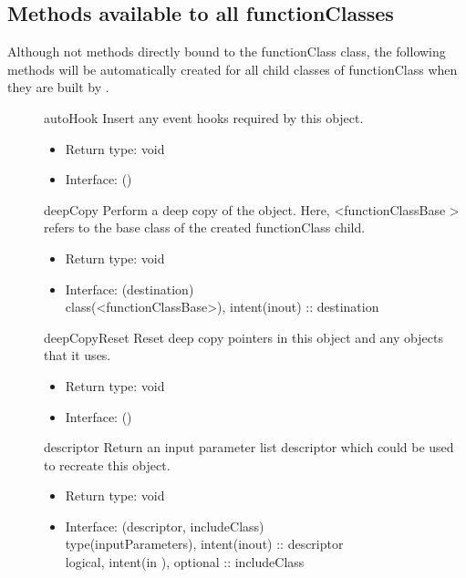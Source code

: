 \subsection{Methods available to all {\normalfont \ttfamily functionClass}es}\label{sec:functionClassAll}

Although not methods directly bound to the {\normalfont \ttfamily functionClass} class, the following methods will be automatically created for all child classes of {\normalfont \ttfamily functionClass} when they are built by \glc.


\begin{description}
  
\item[]{\normalfont \ttfamily autoHook} Insert any event hooks required by this object. 
\begin{itemize}
\item Return type: {\normalfont \ttfamily void}
\item Interface: {\normalfont \ttfamily ()}\\
\end{itemize}

\item[]{\normalfont \ttfamily deepCopy}  Perform a deep copy of the object. Here, {\normalfont \ttfamily \textless functionClassBase \textgreater} refers to the base class of the created {\normalfont \ttfamily functionClass} child.
\begin{itemize}
\item Return type: {\normalfont \ttfamily void}
\item Interface: {\normalfont \ttfamily (destination)}\\
  {\normalfont \ttfamily class(\textless functionClassBase\textgreater), intent(inout) :: destination}\\
\end{itemize}

\item[]{\normalfont \ttfamily deepCopyReset} Reset deep copy pointers in this object and any objects that it uses.
\begin{itemize}
\item Return type: {\normalfont \ttfamily void}
\item Interface: {\normalfont \ttfamily ()}\\
\end{itemize}

\item[]{\normalfont \ttfamily descriptor} Return an input parameter list descriptor which could be used to recreate this object.
\begin{itemize}
\item Return type: {\normalfont \ttfamily void}
\item Interface: {\normalfont \ttfamily (descriptor, includeClass)}\\
  {\normalfont \ttfamily type(inputParameters), intent(inout) :: descriptor}\\
  {\normalfont \ttfamily logical, intent(in   ), optional :: includeClass}\\
\end{itemize}


\end{description}
